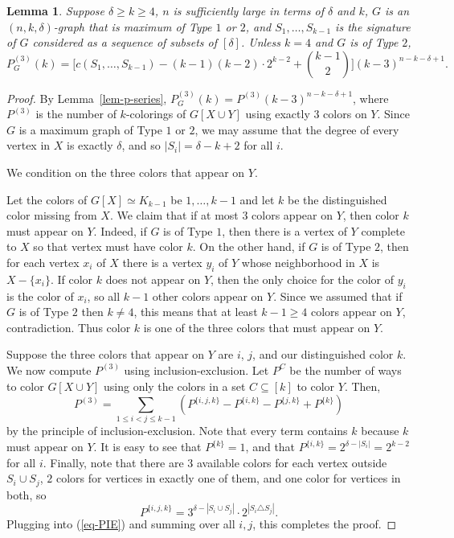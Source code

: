 \documentclass[11pt]{article}
\theoremstyle{plain}
\newtheorem{lemma}[theorem]{Lemma}
\theoremstyle{definition}
\theoremstyle{remark}
\begin{document}
\begin{lemma}\label{lem:signature}
Suppose $\delta \ge k\ge 4$, $n$ is sufficiently large in terms of $\delta$ and $k$, $G$ is an $(n,k,\delta)$-graph that is maximum of Type $1$ or $2$, and $S_1,\ldots, S_{k-1}$ is the signature of $G$ considered as a sequence of subsets of $[\delta]$. Unless $k=4$ and $G$ is of Type $2$,
\[
P_G^{(3)}(k) = \Big[c(S_1,\ldots, S_{k-1}) - (k-1)(k-2)\cdot 2^{k-2} + {k-1 \choose 2}\Big](k-3)^{n-k-\delta +1}.
\]
\end{lemma}
\begin{proof}
By Lemma~\ref{lem-p-series}, $P_G^{(3)}(k) = P^{(3)}(k-3)^{n-k-\delta+1}$, where $P^{(3)}$ is the number of $k$-colorings of $G[X\cup Y]$ using exactly $3$ colors on $Y$. Since $G$ is a maximum graph of Type $1$ or $2$, we may assume that the degree of every vertex in $X$ is exactly $\delta$, and so $|S_i| = \delta - k +2$ for all $i$.

We condition on the three colors that appear on $Y$. 

Let the colors of $G[X]\simeq K_{k-1}$ be $1,\ldots, k-1$ and let $k$ be the distinguished color missing from $X$. We claim that if at most $3$ colors appear on $Y$, then color $k$ must appear on $Y$. Indeed, if $G$ is of Type $1$, then there is a vertex of $Y$ complete to $X$ so that vertex must have color $k$. On the other hand, if $G$ is of Type $2$, then for each vertex $x_i$ of $X$ there is a vertex $y_i$ of $Y$ whose neighborhood in $X$ is $X-\{x_i\}$. If color $k$ does not appear on $Y$, then the only choice for the color of $y_i$ is the color of $x_i$, so all $k-1$ other colors appear on $Y$. Since we assumed that if $G$ is of Type $2$ then $k\ne 4$, this means that at least $k-1\ge 4$ colors appear on $Y$, contradiction. Thus color $k$ is one of the three colors that must appear on $Y$.

Suppose the three colors that appear on $Y$ are $i$, $j$, and our distinguished color $k$. We now compute $P^{(3)}$ using inclusion-exclusion. Let $P^{C}$ be the number of ways to color $G[X\cup Y]$ using only the colors in a set $C\subseteq[k]$ to color $Y$. Then,
\begin{equation}\label{eq-PIE}
P^{(3)} = \sum_{1\le i < j \le k-1} (P^{\{i,j,k\}} - P^{\{i,k\}} - P^{\{j,k\}} + P^{\{k\}})
\end{equation}
by the principle of inclusion-exclusion. Note that every term contains $k$ because $k$ must appear on $Y$. It is easy to see that $P^{\{k\}} = 1$, and that $P^{\{i,k\}} = 2^{\delta - |S_i|} = 2^{k-2}$ for all $i$. Finally, note that there are $3$ available colors for each vertex outside $S_i \cup S_j$, $2$ colors for vertices in exactly one of them, and one color for vertices in both, so
\[
P^{\{i, j, k\}} = 3^{\delta - |S_i\cup S_j|}\cdot 2^{|S_i \triangle S_j|}.
\]
Plugging into (\ref{eq-PIE}) and summing over all $i, j$, this completes the proof.
\end{proof}
\end{document}
